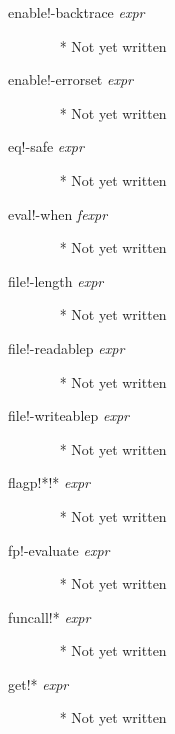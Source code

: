\documentclass[a4paper,11pt]{article}
\begin{document}
\begin{description}
\item [{\ttfamily enable!-backtrace} {\itshape  expr}]  ~\newline
  * Not yet written

\item [{\ttfamily enable!-errorset} {\itshape  expr}]  ~\newline
  * Not yet written

\item [{\ttfamily eq!-safe} {\itshape  expr}]  ~\newline
  * Not yet written

\item [{\ttfamily eval!-when} {\itshape  fexpr}]  ~\newline
  * Not yet written

\item [{\ttfamily file!-length} {\itshape  expr}]  ~\newline
  * Not yet written

\item [{\ttfamily file!-readablep} {\itshape  expr}]  ~\newline
  * Not yet written

\item [{\ttfamily file!-writeablep} {\itshape  expr}]  ~\newline
  * Not yet written

\item [{\ttfamily flagp!*!*} {\itshape  expr}]  ~\newline
  * Not yet written

\item [{\ttfamily fp!-evaluate} {\itshape  expr}]  ~\newline
  * Not yet written

\item [{\ttfamily funcall!*} {\itshape  expr}]  ~\newline
  * Not yet written

\item [{\ttfamily get!*} {\itshape  expr}]  ~\newline
  * Not yet written


\end{description}
\end{document}

